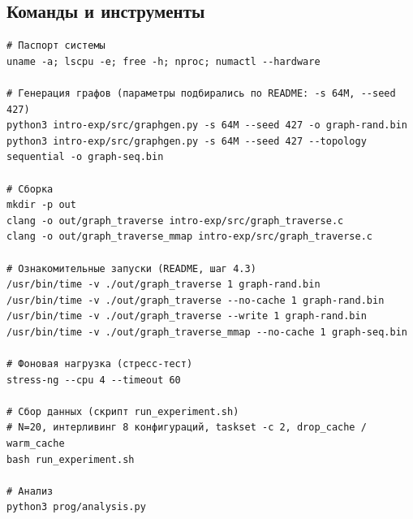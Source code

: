 \documentclass[12pt,a4paper]{article}
\begin{document}
\subsection{Команды и инструменты}
\begin{verbatim}
# Паспорт системы
uname -a; lscpu -e; free -h; nproc; numactl --hardware

# Генерация графов (параметры подбирались по README: -s 64M, --seed 427)
python3 intro-exp/src/graphgen.py -s 64M --seed 427 -o graph-rand.bin
python3 intro-exp/src/graphgen.py -s 64M --seed 427 --topology sequential -o graph-seq.bin

# Сборка
mkdir -p out
clang -o out/graph_traverse intro-exp/src/graph_traverse.c
clang -o out/graph_traverse_mmap intro-exp/src/graph_traverse.c

# Ознакомительные запуски (README, шаг 4.3)
/usr/bin/time -v ./out/graph_traverse 1 graph-rand.bin
/usr/bin/time -v ./out/graph_traverse --no-cache 1 graph-rand.bin
/usr/bin/time -v ./out/graph_traverse --write 1 graph-rand.bin
/usr/bin/time -v ./out/graph_traverse_mmap --no-cache 1 graph-seq.bin

# Фоновая нагрузка (стресс-тест)
stress-ng --cpu 4 --timeout 60

# Сбор данных (скрипт run_experiment.sh)
# N=20, интерливинг 8 конфигураций, taskset -c 2, drop_cache / warm_cache
bash run_experiment.sh

# Анализ
python3 prog/analysis.py
\end{verbatim}
\end{document}
